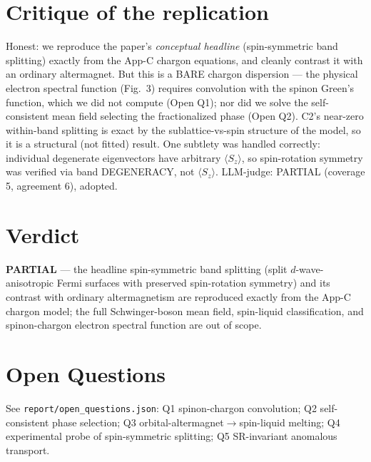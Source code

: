 \documentclass[11pt]{article}
\begin{document}
\section{Critique of the replication}
Honest: we reproduce the paper's \emph{conceptual headline} (spin-symmetric band splitting) exactly
from the App-C chargon equations, and cleanly contrast it with an ordinary altermagnet. But this is a
BARE chargon dispersion --- the physical electron spectral function (Fig.~3) requires convolution with
the spinon Green's function, which we did not compute (Open Q1); nor did we solve the self-consistent
mean field selecting the fractionalized phase (Open Q2). C2's near-zero within-band splitting is exact
by the sublattice-vs-spin structure of the model, so it is a structural (not fitted) result. One
subtlety was handled correctly: individual degenerate eigenvectors have arbitrary $\langle S_z\rangle$,
so spin-rotation symmetry was verified via band DEGENERACY, not $\langle S_z\rangle$. LLM-judge:
PARTIAL (coverage 5, agreement 6), adopted.

\section{Verdict}
\textbf{PARTIAL} --- the headline spin-symmetric band splitting (split $d$-wave-anisotropic Fermi
surfaces with preserved spin-rotation symmetry) and its contrast with ordinary altermagnetism are
reproduced exactly from the App-C chargon model; the full Schwinger-boson mean field, spin-liquid
classification, and spinon-chargon electron spectral function are out of scope.

\section*{Open Questions}
See \texttt{report/open\_questions.json}: Q1 spinon-chargon convolution; Q2 self-consistent phase
selection; Q3 orbital-altermagnet$\to$spin-liquid melting; Q4 experimental probe of spin-symmetric
splitting; Q5 SR-invariant anomalous transport.
\end{document}
